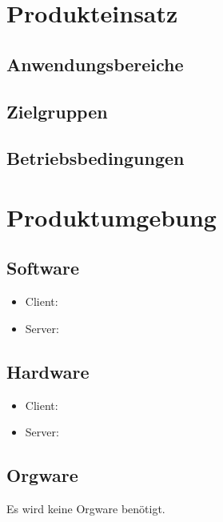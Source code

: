 \documentclass[a4paper]{scrreprt}
\newcounter{Lc}
\newcounter{Hc}
\newcommand{\resetAllCounter}{\setcounter{Lc}{0}\setcounter{Hc}{1}}
\begin{document}
        
  
\chapter{Produkteinsatz}
    \section{Anwendungsbereiche}
		   
     
	\section{Zielgruppen}
        
    
	\section{Betriebsbedingungen}
       
	
			
 
\chapter{Produktumgebung}
	\section{Software}
        \begin{itemize}
      		\item Client:
      		
          	\item Server:
            
        \end{itemize}
    \section{Hardware}   
        \begin{itemize}
          	\item Client:
            
          	\item Server:
           
        \end{itemize}
     \section{Orgware}
             Es wird keine Orgware benötigt.

\resetAllCounter
\newcommand{\Func}[1]{\stepcounter{Lc}\textcolor{Blue}{\textbf{/F\arabic{Hc}0-\arabic{Lc}0/} #1} \\}
\newcommand{\FuncW}[1]{\stepcounter{Lc}\textcolor{Green}{\textbf{/F\arabic{Hc}0-\arabic{Lc}0W/} #1} \\}
\newcommand{\FuncBlue}[1]{\textcolor{Blue}{\textbf{#1}}}
\newcommand{\FuncGreen}[1]{\textcolor{Green}{\textbf{#1}}}
\end{document}
